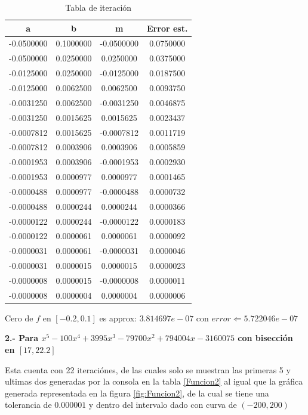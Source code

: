 \documentclass[12pt,a4paper]{article}
\begin{document}
\begin{table}[ht]
\centering
\begin{tabular}{|c|c|c|c|}
\hline
a          & b         & m          & Error est. \\ \hline
-0.0500000 & 0.1000000 & -0.0500000 & 0.0750000  \\ \hline
-0.0500000 & 0.0250000 & 0.0250000  & 0.0375000  \\ \hline
-0.0125000 & 0.0250000 & -0.0125000 & 0.0187500  \\ \hline
-0.0125000 & 0.0062500 & 0.0062500  & 0.0093750  \\ \hline
-0.0031250 & 0.0062500 & -0.0031250 & 0.0046875  \\ \hline
-0.0031250 & 0.0015625 & 0.0015625  & 0.0023437  \\ \hline
-0.0007812 & 0.0015625 & -0.0007812 & 0.0011719  \\ \hline
-0.0007812 & 0.0003906 & 0.0003906  & 0.0005859  \\ \hline
-0.0001953 & 0.0003906 & -0.0001953 & 0.0002930  \\ \hline
-0.0001953 & 0.0000977 & 0.0000977  & 0.0001465  \\ \hline
-0.0000488 & 0.0000977 & -0.0000488 & 0.0000732  \\ \hline
-0.0000488 & 0.0000244 & 0.0000244  & 0.0000366  \\ \hline
-0.0000122 & 0.0000244 & -0.0000122 & 0.0000183  \\ \hline
-0.0000122 & 0.0000061 & 0.0000061  & 0.0000092  \\ \hline
-0.0000031 & 0.0000061 & -0.0000031 & 0.0000046  \\ \hline
-0.0000031 & 0.0000015 & 0.0000015  & 0.0000023  \\ \hline
-0.0000008 & 0.0000015 & -0.0000008 & 0.0000011  \\ \hline
-0.0000008 & 0.0000004 & 0.0000004  & 0.0000006  \\ \hline
\end{tabular}
\caption{Tabla de iteración}
\label{Funcion1}
\end{table}

Cero de $f$ en $[-0.2 , 0.1]$ es approx:  $3.814697e-07$ con $error \Leftarrow 5.722046e-07$

\newpage
\textbf{2.- Para $x^5 - 100x^4 + 3995x^3 - 79700x^2 + 794004x - 3160075$ con bisección en $[17,22.2]$}

Esta cuenta con 22 iteraciónes, de las cuales solo se muestran las primeras 5 y ultimas dos generadas por la consola en la tabla \ref{Funcion2} al igual que la gráfica generada representada en la figura \ref{fig:Funcion2}, de la cual se tiene una tolerancia de $0.000001$ y dentro del intervalo dado con curva de $(-200,200)$
 
\end{document}
